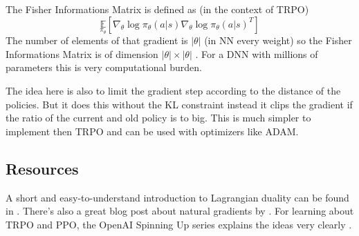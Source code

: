 \begin{enumerate}
\newline
The Fisher Informations Matrix is defined as (in the context of TRPO)
$$\underset{\pi_\theta}{\mathbb{E}}[\nabla_\theta \log{\pi_\theta(a|s)}{\nabla_\theta \log{\pi_\theta(a|s)}}^T]$$
The number of elements of that gradient is $|\theta|$ (in NN every weight) so the Fisher Informations Matrix is of dimension $|\theta|\times|\theta|$ 
. For a DNN with millions of parameters this is very computational burden. 

\newline The idea here is also to limit the gradient step according to the distance of the policies. But it does this without the KL constraint instead it clips the gradient if the ratio of the current and old policy is to big. This is much simpler to implement then TRPO and can be used with optimizers like ADAM.
\end{enumerate}

\subsection{Resources}
A short and easy-to-understand introduction to Lagrangian duality can be found in 
\cite{Lagrangian_Duality_for_Dummies}. There's also a great blog post about natural gradients by 
\cite{natural_gradients}. For learning about TRPO and PPO, the OpenAI Spinning Up series explains the 
ideas very clearly \cite{OpenAI_Spinning_UP}.